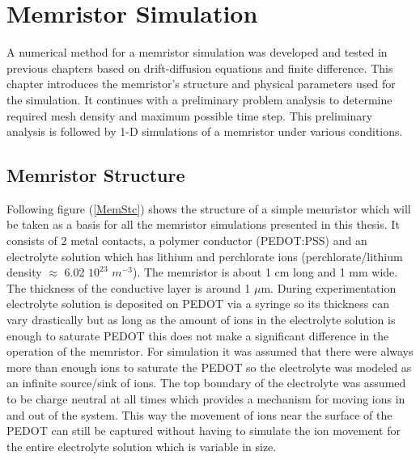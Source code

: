 
\chapter{Memristor Simulation} %

\label{Chapter5} %


\begin{doublespace}

A numerical method for a memristor simulation was developed and tested in previous chapters based on drift-diffusion equations and finite difference. This chapter introduces the memristor's structure and physical parameters used for the simulation. It continues with a preliminary problem analysis to determine required mesh density and maximum possible time step. This preliminary analysis is followed by 1-D simulations of a memristor under various conditions.


\section{Memristor Structure}

Following figure (\ref{MemStc}) shows the structure of a simple memristor which will be taken as a basis for all the memristor simulations presented in this thesis. It consists of 2 metal contacts, a polymer conductor (PEDOT:PSS) and an electrolyte solution which has lithium and perchlorate ions (perchlorate/lithium density $\approx$ 6.02 $10^{23}$ $m^{-3}$). The memristor is about 1 cm long and 1 mm wide. The thickness of the conductive layer is around 1 $\mu$m. During experimentation electrolyte solution is deposited on PEDOT via a syringe so its thickness can vary drastically but as long as the amount of ions in the electrolyte solution is enough to saturate PEDOT this does not make a significant difference in the operation of the memristor. For simulation it was assumed that there were always more than enough ions to saturate the PEDOT so the electrolyte was modeled as an infinite source/sink of ions. The top boundary of the electrolyte was assumed to be charge neutral at all times which provides a mechanism for moving ions in and out of the system. This way the movement of ions near the surface of the PEDOT can still be captured without having to simulate the ion movement for the entire electrolyte solution which is variable in size. 


\end{doublespace}
